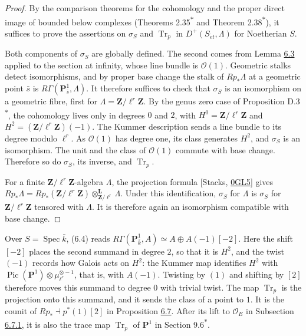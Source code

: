 \documentclass[11pt]{article}
\newcommand{\bpout}[1]{#1\textsuperscript{\hyperlink{bp-outside}{\ensuremath{\ast}}}}
\begin{document}
\begin{proof}[{Proof}]\label{bp15}%
By the comparison theorems for the cohomology and the proper direct image of bounded below complexes (Theorems \bpout{2.35} and \bpout{Theorem 2.38}), it suffices to prove the assertions on \(\sigma_S\) and \(\operatorname{Tr}_p\) in \(D^+(S_{\acute{e}t},\Lambda)\) for Noetherian \(S\).

Both components of \(\sigma_S\) are globally defined. The second comes from Lemma \hyperref[bp11]{6.3} applied to the section at infinity, whose line bundle is \(\mathcal O(1)\). Geometric stalks detect isomorphisms, and by proper base change the stalk of \(Rp_*\Lambda\) at a geometric point \(\bar s\) is \(R\Gamma(\mathbf P^1_{\bar s},\Lambda)\). It therefore suffices to check that \(\sigma_S\) is an isomorphism on a geometric fibre, first for \(\Lambda=\mathbf Z/\ell^r\mathbf Z\). By the genus zero case of Proposition \bpout{D.3}, the cohomology lives only in degrees \(0\) and \(2\), with \(H^0=\mathbf Z/\ell^r\mathbf Z\) and \(H^2=(\mathbf Z/\ell^r\mathbf Z)(-1)\). The Kummer description sends a line bundle to its degree modulo \(\ell^r\). As \(\mathcal O(1)\) has degree one, its class generates \(H^2\), and \(\sigma_S\) is an isomorphism. The unit and the class of \(\mathcal O(1)\) commute with base change. Therefore so do \(\sigma_S\), its inverse, and \(\operatorname{Tr}_p\).

For a finite \(\mathbf Z/\ell^r\mathbf Z\)-algebra \(\Lambda\), the projection formula [Stacks, \href{https://stacks.math.columbia.edu/tag/0GL5}{0GL5}] gives \(Rp_*\Lambda=Rp_*(\mathbf Z/\ell^r\mathbf Z)
\otimes^{\mathbf L}_{\mathbf Z/\ell^r}\Lambda\). Under this identification, \(\sigma_S\) for \(\Lambda\) is \(\sigma_S\) for \(\mathbf Z/\ell^r\mathbf Z\) tensored with \(\Lambda\). It is therefore again an isomorphism compatible with base change.
\end{proof}

\label{bp16}%
Over \(S=\operatorname{Spec}\bar k\), (6.4) reads \(R\Gamma(\mathbf P^1_{\bar k},A)\simeq A\oplus A(-1)[-2]\). Here the shift \([-2]\) places the second summand in degree \(2\), so that it is \(H^2\), and the twist \((-1)\) records how Galois acts on \(H^2\): the Kummer map identifies \(H^2\) with \(\operatorname{Pic}(\mathbf P^1)\otimes\mu_{\ell^r}^{\otimes-1}\), that is, with \(A(-1)\). Twisting by \((1)\) and shifting by \([2]\) therefore moves this summand to degree \(0\) with trivial twist. The map \(\operatorname{Tr}_p\) is the projection onto this summand, and it sends the class of a point to \(1\). It is the counit of \(Rp_*\dashv p^*(1)[2]\) in Proposition \hyperref[bp22]{6.7}. After its lift to \(\mathcal O_E\) in Subsection \hyperref[bp67]{6.7.1}, it is also the trace map \(\operatorname{Tr}_p\) of \(\mathbf P^1\) in Section \bpout{9.6}.
\end{document}
